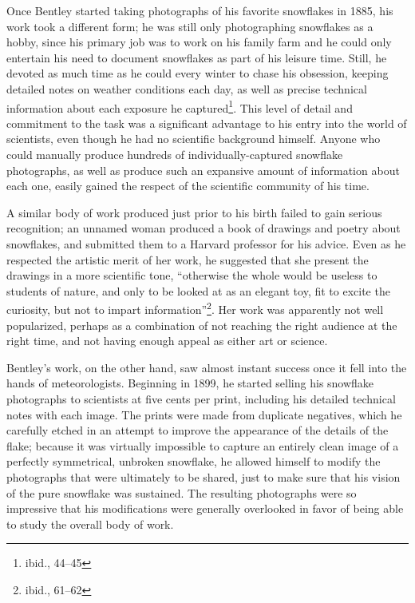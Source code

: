 Once Bentley started taking photographs of his favorite snowflakes in 1885, his
work took a different form; he was still only photographing snowflakes as a
hobby, since his primary job was to work on his family farm and he could only
entertain his need to document snowflakes as part of his leisure time. Still, he
devoted as much time as he could every winter to chase his obsession, keeping
detailed notes on weather conditions each day, as well as precise technical
information about each exposure he captured\footnote{ibid., 44--45}. This level
of detail and commitment to the task was a significant advantage to his entry
into the world of scientists, even though he had no scientific background
himself. Anyone who could manually produce hundreds of individually-captured
snowflake photographs, as well as produce such an expansive amount of
information about each one, easily gained the respect of the scientific
community of his time.

A similar body of work produced just prior to his birth failed to gain serious
recognition; an unnamed woman produced a book of drawings and poetry about
snowflakes, and submitted them to a Harvard professor for his advice. Even as he
respected the artistic merit of her work, he suggested that she present the
drawings in a more scientific tone, ``otherwise the whole would be useless to
students of nature, and only to be looked at as an elegant toy, fit to excite
the curiosity, but not to impart information''\footnote{ibid., 61--62}. Her work
was apparently not well popularized, perhaps as a combination of not reaching
the right audience at the right time, and not having enough appeal as either art
or science.

Bentley's work, on the other hand, saw almost instant success once it fell into
the hands of meteorologists. Beginning in 1899, he started selling his snowflake
photographs to scientists at five cents per print, including his detailed
technical notes with each image. The prints were made from duplicate negatives,
which he carefully etched in an attempt to improve the appearance of the details
of the flake; because it was virtually impossible to capture an entirely clean
image of a perfectly symmetrical, unbroken snowflake, he allowed himself to
modify the photographs that were ultimately to be shared, just to make sure that
his vision of the pure snowflake was sustained. The resulting photographs were
so impressive that his modifications were generally overlooked in favor of being
able to study the overall body of work.

